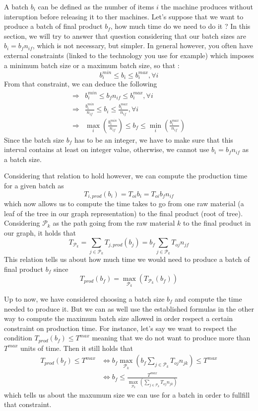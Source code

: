 A batch $b_i$ can be defined as the number of items $i$ the machine produces without interuption before releasing it to ther machines. Let's suppose that we want to produce a batch of final product $b_f$, how much time do we need to do it ? In this section, we will try to answer that question considering that our batch sizes are $b_i = b_fn_{if}$, which is not necessary, but simpler. In general however, you often have external constraints (linked to the technology you use for example) which imposes a minimum batch size or a maximum batch size, so that : 
\[ b_i^{min} \le b_i \le b_i^{max}, \forall i \]
From that constraint, we can deduce the following
\[
    \begin{split}
        \Rightarrow & b_i^{min} \le b_fn_{if} \le b_i^{max}, \forall i \\
        \Rightarrow & \frac{b_i^{min}}{n_{if}} \le b_i \le \frac{b_i^{max}}{n_{if}}, \forall i\\
        \Rightarrow & \max_i\left( \frac{b_i^{min}}{n_{if}} \right) \le b_f \le \min_i\left( \frac{b_i^{max}}{n_{if}} \right)
    \end{split}
\]
Since the batch size $b_f$ has to be an integer, we have to make sure that this interval contains at least on integer value, otherwise, we cannot use $b_i = b_fn_{if}$ as a batch size. 

Considering that relation to hold however, we can compute the production time for a given batch as \[ T_{i,prod}(b_i) = T_{oi}b_i = T_{oi}b_fn_{if} \] which now allows us to compute the time takes to go from one raw material (a leaf of the tree in our graph representation) to the final product (root of tree). Considering $\mathcal P_k$ as the path going from the raw material $k$ to the final product in our graph, it holds that \[ T_{\mathcal P_k} = \sum_{j\in\mathcal P_k}T_{j,prod}(b_j) = b_f\sum_{j\in\mathcal P_k} T_{oj}n_{jf} \] This relation tells us about how much time we would need to produce a batch of final product $b_f$ since \[ T_{prod}(b_f) = \max_{\mathcal P_k}\left( T_{\mathcal P_k}(b_f) \right) \]

Up to now, we have considered choosing a batch size $b_f$ and compute the time needed to produce it. But we can as well use the established formulas in the other way to compute the maximum batch size allowed in order respect a certain constraint on production time. For instance, let's say we want to respect the condition $T_{prod}(b_f) \le T^{max}$ meaning that we do not want to produce more than $T^{max}$ units of time. Then it still holds that 
\[
    \begin{split}
        T_{prod}(b_f) \le T^{max}
            &\Leftrightarrow b_f\max_{\mathcal P_k}\left( b_f\sum_{j\in\mathcal P_k} T_{oj}n_{jk} \right) \le T^{max}\\
            &\Leftrightarrow b_f \le \frac{T^{max}}{ \max_{\mathcal P_k}\left( \sum_{j\in\mathcal P_k} T_{oj}n_{jk} \right) }
    \end{split}
\] which tells us about the maxumum size we can use for a batch in order to fullfill that constraint. 

